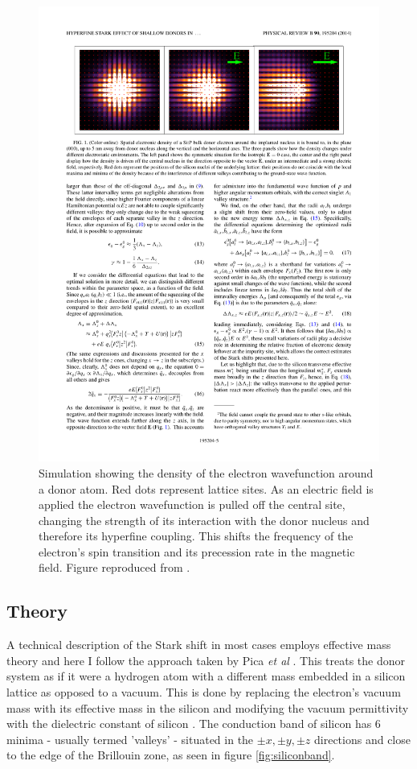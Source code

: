 \begin{figure}
\centering
\includegraphics[width=\textwidth]{Figures/starkShift.pdf}
\caption[Electron wavefunction Stark shift]{Simulation showing the density of the electron wavefunction around a donor atom. Red dots represent lattice sites. As an electric field is applied the electron wavefunction is pulled off the central site, changing the strength of its interaction with the donor nucleus and therefore its hyperfine coupling. This shifts the frequency of the electron's spin transition and its precession rate in the magnetic field. Figure reproduced from \cite{Pica2014}.}
\label{fig:starkShift}
\end{figure}

\subsection{Theory}

A technical description of the Stark shift in most cases employs effective mass theory and here I follow the approach taken by Pica \emph{et al} \cite{Pica2014}.
This treats the donor system as if it were a hydrogen atom with a different mass embedded in a silicon lattice as opposed to a vacuum.
This is done by replacing the electron's vacuum mass with its effective mass in the silicon and modifying the vacuum permittivity with the dielectric constant of silicon \cite{Wolfowicz2015a}.
The conduction band of silicon has 6 minima - usually termed 'valleys' - situated in the $\pm x, \pm y, \pm z$ directions and close to the edge of the Brillouin zone, as seen in figure \ref{fig:siliconband}.

